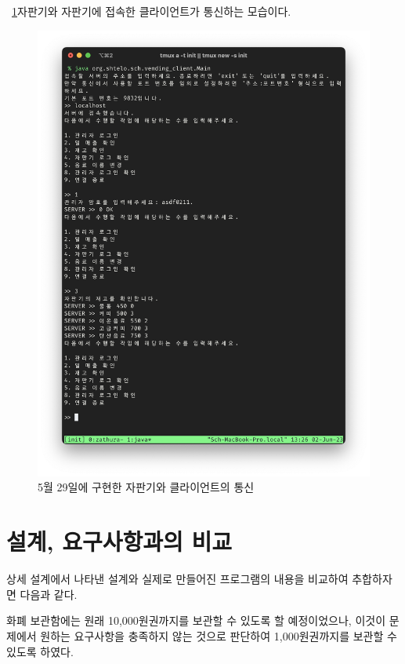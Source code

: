 \documentclass{oblivoir}
\newcommand{\figref}[1]{\figurename~\ref{#1}}
\begin{document}
    \figref{fig:0529-client}\는 자판기와 자판기에 접속한 클라이언트가 통신하는 모습이다.
    \begin{figure}[h]
        \centering
        \includegraphics[width=\textwidth]{images/dev-snapshop/0529-client}
        \caption{5월 29일에 구현한 자판기와 클라이언트의 통신}
        \label{fig:0529-client}
    \end{figure}

    \section{설계, 요구사항과의 비교}

    상세 설계에서 나타낸 설계와 실제로 만들어진 프로그램의 내용을 비교하여 추합하자면 다음과 같다.

    화폐 보관함에는 원래 10,000원권까지를 보관할 수 있도록 할 예정이었으나,
    이것이 문제에서 원하는 요구사항을 충족하지 않는 것으로 판단하여 1,000원권까지를 보관할 수 있도록 하였다.
\end{document}
